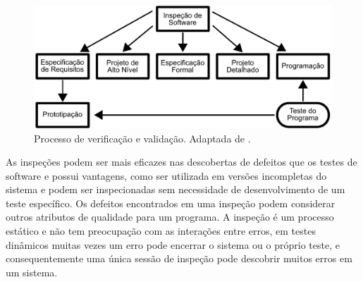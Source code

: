 \begin{figure}[ht]
\centering
\includegraphics[scale=0.7]{imagens/validacao_verificacao.pdf}
\caption{Processo de verificação e validação. Adaptada de \cite{sommerville2010}.}
\label{fig:ver&val}
\end{figure}

As inspeções podem ser mais eficazes nas descobertas de defeitos que os testes de software e possui vantagens, como ser utilizada em  versões incompletas do sistema e podem ser inspecionadas sem necessidade de desenvolvimento de um teste específico. Os defeitos encontrados em uma inspeção podem considerar outros atributos de qualidade para um programa. A inspeção é um processo estático e não  tem  preocupação com as interações entre erros, em testes dinâmicos muitas vezes um erro pode encerrar o sistema ou o próprio teste, e consequentemente uma única sessão de inspeção pode descobrir muitos erros em um sistema. 
% 
% 
% 

